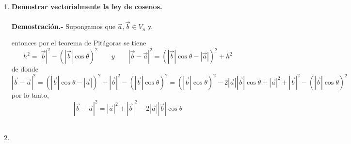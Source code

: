 \begin{enumerate}
\item \textbf{\boldmath Demostrar vectorialmente la ley de cosenos.\\\\
    Demostración.-}\; Supongamos que $\vec{a},\vec{b} \in V_n$ y, 
    \begin{center}
    \end{center}
    entonces por el teorema de Pitágoras se tiene $$h^2=|\vec{b}|^2 - \left(|\vec{b}|\cos \theta\right)^2 \qquad y \qquad |\vec{b}-\vec{a}|^2 = \left(|\vec{b}|\cos \theta - |\vec{a}|\right)^2+h^2$$
    de donde $$|\vec{b}-\vec{a}|^2 = \left(|\vec{b}|\cos \theta - |\vec{a}|\right)^2+|\vec{b}|^2 - \left(|\vec{b}|\cos \theta\right)^2 = \left(|\vec{b}|\cos \theta\right)^2 - 2|\vec{a}||\vec{b}|\cos \theta + |\vec{a}|^2 + |\vec{b}|^2 - \left(|\vec{b}|\cos \theta\right)^2$$
    por lo tanto, $$|\vec{b}-\vec{a}|^2 = |\vec{a}|^2 + |\vec{b}|^2 - 2|\vec{a}||\vec{b}|\cos \theta $$\\

\item 

\end{enumerate}


